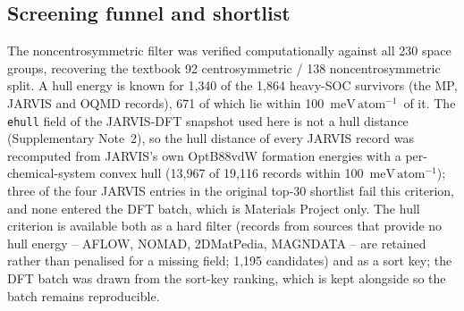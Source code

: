 \documentclass[aps,prb,preprint,superscriptaddress,longbibliography,nofootinbib]{revtex4-2}
\newcommand{\meVat}{\ensuremath{\mathrm{meV\,atom^{-1}}}}
\begin{document}
\subsection*{Screening funnel and shortlist}

The noncentrosymmetric filter was verified computationally against all 230 space groups, recovering the
textbook 92 centrosymmetric / 138 noncentrosymmetric split. A hull energy is known for 1{,}340 of the
1{,}864 heavy-SOC survivors (the MP, JARVIS and OQMD records), 671 of which lie within 100~\meVat\ of
it. The \texttt{ehull} field of the JARVIS-DFT snapshot used here is not a hull distance (Supplementary
Note~2), so the hull distance of every JARVIS record was recomputed from JARVIS's own OptB88vdW formation
energies with a per-chemical-system convex hull (13{,}967 of 19{,}116 records within 100~\meVat); three of the
four JARVIS entries in the original top-30 shortlist fail this criterion, and none entered the DFT batch,
which is Materials Project only. The hull criterion is available both as a hard filter (records from sources that provide no
hull energy -- AFLOW, NOMAD, 2DMatPedia, MAGNDATA -- are retained rather than penalised for a missing field;
1{,}195 candidates) and as a sort key; the DFT batch was drawn from the sort-key ranking, which is kept
alongside so the batch remains reproducible.
\end{document}
